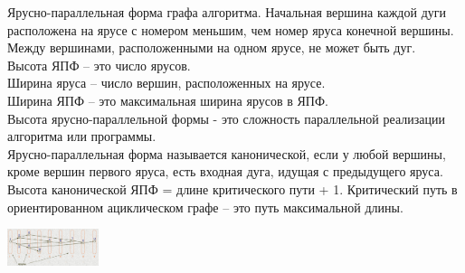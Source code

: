 Ярусно-параллельная форма графа алгоритма.
Начальная вершина каждой дуги расположена на ярусе с номером меньшим, чем номер яруса конечной вершины. Между вершинами, расположенными на одном ярусе, не может быть дуг.\\
Высота ЯПФ – это число ярусов.\\
Ширина яруса – число вершин, расположенных на ярусе.\\
Ширина ЯПФ – это максимальная ширина ярусов в ЯПФ.\\
Высота ярусно-параллельной формы - это сложность параллельной реализации алгоритма или программы.\\
Ярусно-параллельная форма называется канонической, если у любой вершины, кроме вершин первого яруса, есть входная дуга, идущая с предыдущего яруса.\\
Высота канонической ЯПФ = длине критического пути + 1. Критический путь в ориентированном ациклическом графе – это путь максимальной длины.
\begin{center}
\includegraphics[width=0.2\textwidth]{pics/layered-graph-algo.png}
\end{center}

